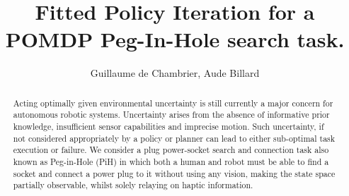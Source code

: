 \documentclass[final,3p,times,twocolumn]{elsarticle}
\begin{document}
\begin{frontmatter}



\title{Fitted Policy Iteration for a POMDP Peg-In-Hole search task.}


\author{Guillaume de Chambrier, Aude Billard}

\address{}




\begin{abstract}

Acting optimally given environmental uncertainty is still currently a major concern for autonomous robotic 
systems. Uncertainty arises from the absence of informative prior knowledge, insufficient sensor capabilities 
and imprecise motion. Such uncertainty, if not considered appropriately by a policy or planner can lead 
to either sub-optimal task execution or failure. We consider a plug power-socket search and connection task 
also known as Peg-in-Hole (PiH) in which both a human and robot must be able to find a socket and connect a power 
plug to it without using any vision, making the state space partially observable, whilst solely relaying on haptic information.


\end{abstract}
\end{frontmatter}
\end{document}
